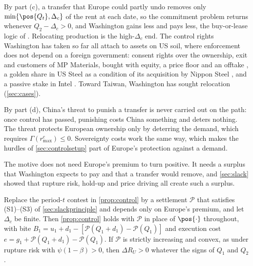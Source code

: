 By part (c), a transfer that Europe could partly undo removes only $\min\{\pos{Q_t},\Delta_c\}$ of the rent at each date, so the commitment problem returns whenever $Q_2-\Delta_c>0$, and Washington gains less and pays less, the buy-or-lease logic of \citet{harstad2016market}. Relocating production is the high-$\Delta_c$ end. The control rights Washington has taken so far all attach to assets on US soil, where enforcement does not depend on a foreign government: consent rights over the ownership, exit and customers of MP Materials, bought with equity, a price floor and an offtake \citep{mp2025dod}, a golden share in US Steel as a condition of its acquisition by Nippon Steel \citep{ussteel2025nsa}, and a passive stake in Intel \citep{intel2025agreement}. Toward Taiwan, Washington has sought relocation (\cref{sec:cases}).

By part (d), China's threat to punish a transfer is never carried out on the path: once control has passed, punishing costs China something and deters nothing. The threat protects European ownership only by deterring the demand, which requires $\Gamma(r^c_{\max})\le 0$. Sovereignty costs work the same way, which makes the hurdles of \cref{sec:controlsetup} part of Europe's protection against a demand.

The motive does not need Europe's premium to turn positive. It needs a surplus that Washington expects to pay and that a transfer would remove, and \cref{sec:slack} showed that rupture risk, hold-up and price driving all create such a surplus.

\begin{remark}\label{rem:controlsettle}
Replace the period-$t$ contest in \cref{prop:control} by a settlement $\mathcal P$ that satisfies (S1)--(S3) of \cref{sec:slackprinciple} and depends only on Europe's premium, and let $\Delta_c$ be finite. Then \cref{prop:control} holds with $\mathcal P$ in place of $\pos{\cdot}$ throughout, with bite $B_1=u_1+d_1-[\mathcal P(Q_1+d_1)-\mathcal P(Q_1)]$ and execution cost $e=g_1+\mathcal P(Q_1+d_1)-\mathcal P(Q_1)$. If $\mathcal P$ is strictly increasing and convex, as under rupture risk with $\psi(1-\beta)>0$, then $\Delta R_U>0$ whatever the signs of $Q_1$ and $Q_2$.
\end{remark}

